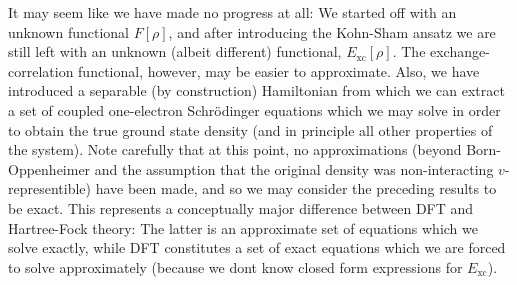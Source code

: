 \documentclass[../../master.tex]{subfiles}
\begin{document}
It may seem like we have made no progress at all: We started off with an unknown functional $F[\rho]$, and after introducing the Kohn-Sham ansatz we are still left with an unknown (albeit different) functional, $E_\text{xc}[\rho]$. The exchange-correlation functional, however, may be easier to approximate. Also, we have introduced a separable (by construction) Hamiltonian from which we can extract a set of coupled one-electron Schrödinger equations which we may solve in order to obtain the true ground state density (and in principle all other properties of the system). Note carefully that at this point, no approximations (beyond Born-Oppenheimer and the assumption that the original density was non-interacting $v$-representible) have been made, and so we may consider the preceding results to be exact. This represents a conceptually major difference between DFT and Hartree-Fock theory: The latter is an approximate set of equations which we solve exactly, while DFT constitutes a set of exact equations which we are forced to solve approximately (because we dont know closed form expressions for $E_\text{xc}$).
\end{document}
